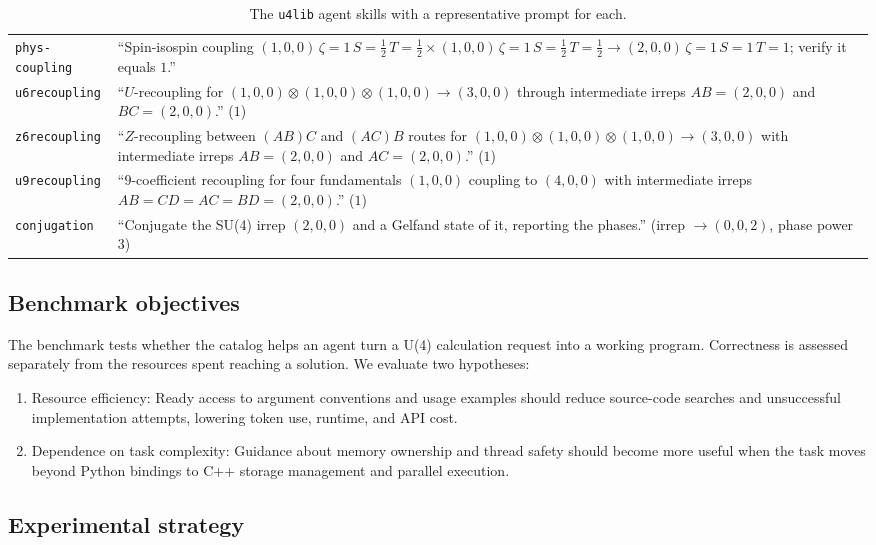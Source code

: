 \documentclass[aps,onecolumn,10pt,superscriptaddress,floatfix,nofootinbib]{revtex4}
\begin{document}
\begin{table}[tp]
\begin{tabular}{p{3.1cm}p{13.2cm}}
    \verb|phys-coupling| & ``Spin-isospin coupling $(1,0,0)\,\zeta{=}1\,S{=}\tfrac12\,T{=}\tfrac12 \times (1,0,0)\,\zeta{=}1\,S{=}\tfrac12\,T{=}\tfrac12 \to (2,0,0)\,\zeta{=}1\,S{=}1\,T{=}1$; verify it equals $1$.'' \\
    \verb|u6recoupling| & ``$U$-recoupling for $(1,0,0)\otimes(1,0,0)\otimes(1,0,0)\to(3,0,0)$ through intermediate irreps $AB=(2,0,0)$ and $BC=(2,0,0)$.'' ($1$) \\
    \verb|z6recoupling| & ``$Z$-recoupling between $(AB)C$ and $(AC)B$ routes for $(1,0,0)\otimes(1,0,0)\otimes(1,0,0)\to(3,0,0)$ with intermediate irreps $AB=(2,0,0)$ and $AC=(2,0,0)$.'' ($1$) \\
    \verb|u9recoupling| & ``$9$-coefficient recoupling for four fundamentals $(1,0,0)$ coupling to $(4,0,0)$ with intermediate irreps $AB=CD=AC=BD=(2,0,0)$.'' ($1$) \\
    \verb|conjugation| & ``Conjugate the SU(4) irrep $(2,0,0)$ and a Gelfand state of it, reporting the phases.'' (irrep $\to(0,0,2)$, phase power $3$) \\
    \hline\hline
    \end{tabular}
    \caption{The \texttt{u4lib} agent skills with a representative prompt for each.}
    \label{tab:prompts}
\end{table}

\subsection{Benchmark objectives}
\label{app:benchmarking}
The benchmark tests whether the catalog helps an agent turn a U(4) calculation request
into a working program. Correctness is assessed separately from the resources
spent reaching a solution. We evaluate two hypotheses:
\begin{enumerate}
    \item {Resource efficiency:} Ready access to argument conventions and
    usage examples should reduce source-code searches and unsuccessful
    implementation attempts, lowering token use, runtime, and API cost.
    \item {Dependence on task complexity:} Guidance about memory ownership
    and thread safety should become more useful when the task moves beyond
    Python bindings to C++ storage management and parallel execution.
\end{enumerate}

\subsection{Experimental strategy}
\end{document}
